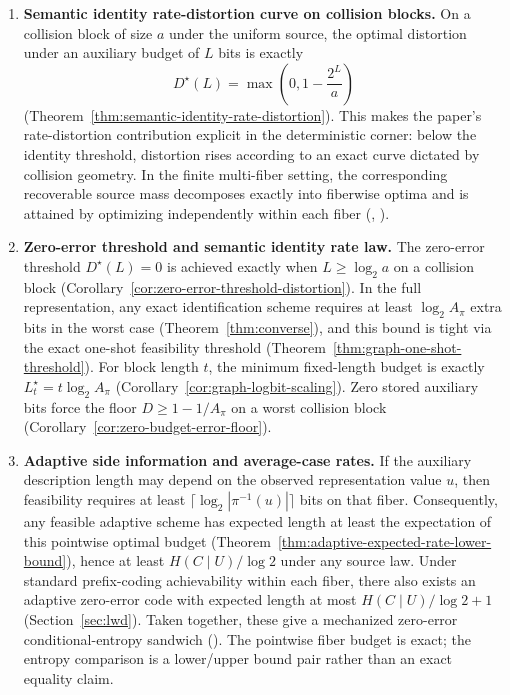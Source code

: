 \begin{enumerate}
\item \textbf{Semantic identity rate-distortion curve on collision blocks.} On a collision block of size $a$ under the uniform source, the optimal distortion under an auxiliary budget of $L$ bits is exactly
\[
D^\star(L) = \max\!\left(0, 1 - \frac{2^L}{a}\right)
\]
(Theorem~\ref{thm:semantic-identity-rate-distortion}). This makes the paper's rate-distortion contribution explicit in the deterministic corner: below the identity threshold, distortion rises according to an exact curve dictated by collision geometry. In the finite multi-fiber setting, the corresponding recoverable source mass decomposes exactly into fiberwise optima and is attained by optimizing independently within each fiber (, ).

\item \textbf{Zero-error threshold and semantic identity rate law.} The zero-error threshold $D^\star(L)=0$ is achieved exactly when $L \ge \log_2 a$ on a collision block (Corollary~\ref{cor:zero-error-threshold-distortion}). In the full representation, any exact identification scheme requires at least $\log_2 A_\pi$ extra bits in the worst case (Theorem~\ref{thm:converse}), and this bound is tight via the exact one-shot feasibility threshold (Theorem~\ref{thm:graph-one-shot-threshold}). For block length $t$, the minimum fixed-length budget is exactly $L_t^\star = t\log_2 A_\pi$ (Corollary~\ref{cor:graph-logbit-scaling}). Zero stored auxiliary bits force the floor $D \ge 1-1/A_\pi$ on a worst collision block (Corollary~\ref{cor:zero-budget-error-floor}).

\item \textbf{Adaptive side information and average-case rates.} If the auxiliary description length may depend on the observed representation value $u$, then feasibility requires at least $\lceil \log_2 |\pi^{-1}(u)| \rceil$ bits on that fiber. Consequently, any feasible adaptive scheme has expected length at least the expectation of this pointwise optimal budget (Theorem~\ref{thm:adaptive-expected-rate-lower-bound}), hence at least $H(C\mid U)/\log 2$ under any source law. Under standard prefix-coding achievability within each fiber, there also exists an adaptive zero-error code with expected length at most $H(C\mid U)/\log 2 + 1$ (Section~\ref{sec:lwd}). Taken together, these give a mechanized zero-error conditional-entropy sandwich (). The pointwise fiber budget is exact; the entropy comparison is a lower/upper bound pair rather than an exact equality claim.


\end{enumerate}
